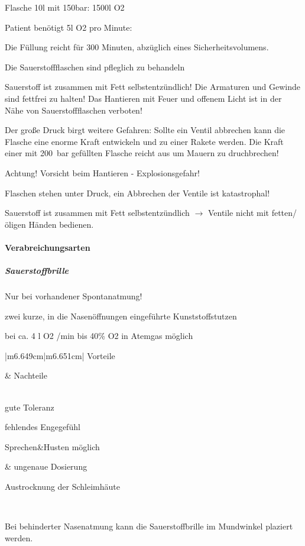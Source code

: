 \documentclass{article}
\begin{document}
Flasche 10l mit 150bar: 1500l  O2

Patient ben\"otigt 5l O2 pro Minute: 

Die F\"ullung reicht f\"ur 300 Minuten, abz\"uglich eines
Sicherheitsvolumens.

Die Sauerstoffflaschen sind pfleglich zu behandeln

Sauerstoff ist zusammen mit Fett selbstentz\"undlich! Die Armaturen und
Gewinde sind fettfrei zu halten! Das Hantieren mit Feuer und offenem
Licht ist in der N\"ahe von Sauerstoffflaschen verboten! 

Der gro{\ss}e Druck birgt weitere Gefahren: Sollte ein Ventil abbrechen
kann die Flasche eine enorme Kraft entwickeln und zu einer Rakete
werden. Die Kraft einer mit 200~bar gef\"ullten Flasche reicht aus um
Mauern zu druchbrechen!  

Achtung! Vorsicht beim Hantieren -  Explosionsgefahr!

Flaschen stehen unter Druck, ein Abbrechen der Ventile ist katastrophal!

Sauerstoff ist zusammen mit Fett selbstentz\"undlich ${\rightarrow}$
Ventile nicht mit fetten/\"oligen H\"anden bedienen.

\paragraph{Verabreichungsarten}
\subparagraph{Sauerstoffbrille}
Nur bei vorhandener Spontanatmung!

zwei kurze, in die Nasen\"offnungen  eingef\"uhrte Kunst\-stoff\-stutzen

bei ca. 4 l O2 /min bis 40\% O2  in Atemgas  m\"oglich

\begin{center}
\tablehead{}\begin{supertabular}{|m{6.649cm}|m{6.651cm}|}
\hline
\centering Vorteile\par

 &
\centering Nachteile\par

\\\hline
gute Toleranz

fehlendes Engegef\"uhl

Sprechen\&Husten m\"oglich

 &
ungenaue Dosierung

Austrocknung  der Schleimh\"aute

\\\hline
\end{supertabular}
\end{center}
Bei behinderter Nasenatmung kann die  Sauerstoffbrille im Mundwinkel
plaziert werden. 
\end{document}
